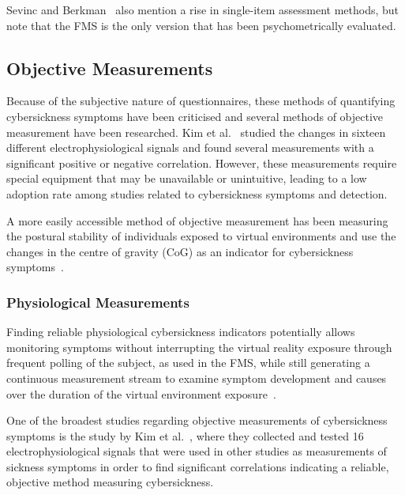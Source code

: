Sevinc and Berkman~\cite{Sevinc2020} also mention a rise in single-item assessment methods, but note that the FMS is
the only version that has been psychometrically evaluated.


\subsection{Objective Measurements}\label{subsec:objective-measurements}

Because of the subjective nature of questionnaires, these methods of quantifying cybersickness symptoms have been
criticised and several methods of objective measurement have been researched.
Kim et al.~\cite{Kim2005} studied the changes in sixteen different electrophysiological signals and found several
measurements with a significant positive or negative correlation.
However, these measurements require special equipment that may be unavailable or unintuitive, leading to a low
adoption rate among studies related to cybersickness symptoms and detection.

A more easily accessible method of objective measurement has been measuring the postural stability of individuals
exposed to virtual environments and use the changes in the centre of gravity (CoG) as an indicator for cybersickness
symptoms~\cite{Lim2020}.


\subsubsection{Physiological Measurements}\label{subsubsec:physiological-measurements}

Finding reliable physiological cybersickness indicators potentially allows monitoring symptoms without interrupting
the virtual reality exposure through frequent polling of the subject, as used in the FMS, while still generating a
continuous measurement stream to examine symptom development and causes over the duration of the virtual environment
exposure~\cite{Rebenitsch2016}.

One of the broadest studies regarding objective measurements of cybersickness symptoms is the study by
Kim et al.~\cite{Kim2005}, where they collected and tested 16 electrophysiological signals that were used in other
studies as measurements of sickness symptoms in order to find significant correlations indicating a reliable,
objective method measuring cybersickness.

